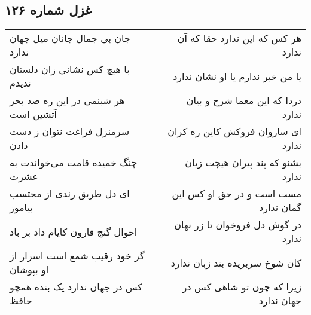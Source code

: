 \begin{center}
\section*{غزل شماره ۱۲۶}
\label{sec:sh126}
\begin{longtable}{l p{0.5cm} r}
جان بی جمال جانان میل جهان ندارد
&&
هر کس که این ندارد حقا که آن ندارد
\\
با هیچ کس نشانی زان دلستان ندیدم
&&
یا من خبر ندارم یا او نشان ندارد
\\
هر شبنمی در این ره صد بحر آتشین است
&&
دردا که این معما شرح و بیان ندارد
\\
سرمنزل فراغت نتوان ز دست دادن
&&
ای ساروان فروکش کاین ره کران ندارد
\\
چنگ خمیده قامت می‌خواندت به عشرت
&&
بشنو که پند پیران هیچت زیان ندارد
\\
ای دل طریق رندی از محتسب بیاموز
&&
مست است و در حق او کس این گمان ندارد
\\
احوال گنج قارون کایام داد بر باد
&&
در گوش دل فروخوان تا زر نهان ندارد
\\
گر خود رقیب شمع است اسرار از او بپوشان
&&
کان شوخ سربریده بند زبان ندارد
\\
کس در جهان ندارد یک بنده همچو حافظ
&&
زیرا که چون تو شاهی کس در جهان ندارد
\\
\end{longtable}
\end{center}
